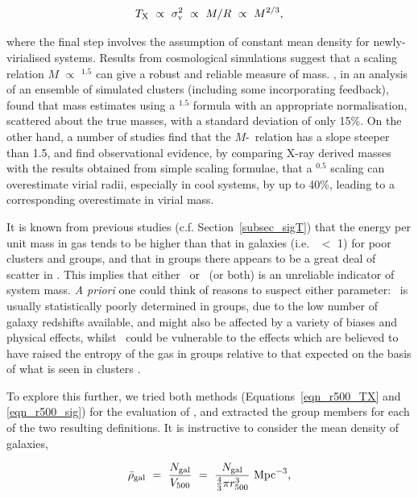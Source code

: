 \documentclass[usenatbib]{mn2e}
\begin{document}
\begin{equation}
T_{\mathrm{X}} ~ \propto ~ \sigma_{\mathrm{v}}^2 ~ \propto ~ M/R ~ \propto ~ M^{2/3},
\label{eqn_tx}
\end{equation}

\noindent where the final step involves the assumption of constant mean density
for newly-virialised systems. Results from cosmological simulations suggest that
a scaling relation $M$ $\propto$ \TX$^{1.5}$ can give a robust and reliable
measure of mass.  \citet{evrard96}, in an analysis of an ensemble of simulated
clusters (including some incorporating feedback), found that mass estimates using
a \TX$^{1.5}$ formula with an appropriate normalisation, scattered about the true
masses, with a standard deviation of only 15\%.  On the other hand, a number of
studies \citep*[e.g.][]{finoguenov01b} find that the $M$-\TX\ relation has a slope
steeper than 1.5, and  \citet{sanderson03a} find observational evidence, by
comparing X-ray derived masses with the results obtained from simple scaling
formulae, that a \TX$^{0.5}$ scaling can overestimate virial radii, especially in
cool systems, by up to 40\%, leading to a corresponding overestimate in virial
mass.

It is known from previous studies (c.f. Section~\ref{subsec_sigT}) that the
energy per unit mass in gas tends to be higher than that in galaxies (i.e.
\betaspec\ $<$ 1) for poor clusters and groups, and that in groups there appears
to be a great deal of scatter in \betaspec.  This implies that either \TX\ or
\sigmav\ (or both) is an unreliable indicator of system mass. {\it A priori} one
could think of reasons to suspect either parameter: \sigmav\ is usually
statistically poorly determined in groups, due to the low number of galaxy
redshifts available, and might also be affected by a variety of biases and
physical effects, whilst \TX\ could be vulnerable to the effects which are
believed to have raised the entropy of the gas in groups relative to that
expected on the basis of what is seen in clusters \citep{ponman99}.

To explore this further, we tried both methods (Equations~\ref{eqn_r500_TX} and
\ref{eqn_r500_sig}) for the evaluation of \rfh, and extracted  the group members
for each of the two resulting definitions.  It is instructive to consider the
mean density of galaxies,

\begin{equation}
\bar{\rho}_{\mathrm{gal}} ~ = ~ \frac{N_{\mathrm{gal}}}{V_{\mathrm{500}}} ~ = ~ \frac{N_{\mathrm{gal}}}{\frac{4}{3}\pi r_{\mathrm{500}}^{3}} ~ \mbox{Mpc}^{-3},
\label{eqn_dengal}
\end{equation} 
\end{document}
